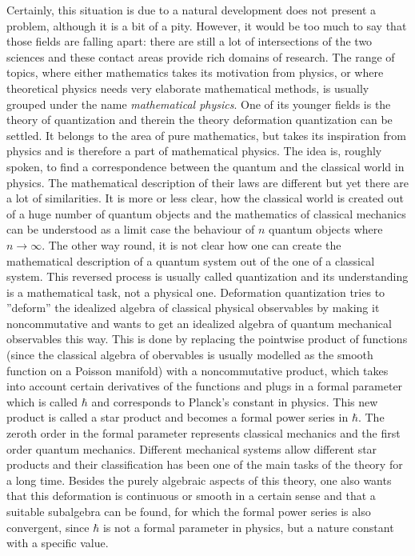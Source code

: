 Certainly, this situation is due to a natural development does not present a 
problem, although it is a bit of a pity. However, it would be too much to say 
that those fields are falling apart: there are still a lot of intersections of 
the two sciences and these contact areas provide rich domains of research. The 
range of topics, where either mathematics takes its motivation from physics, 
or where theoretical physics needs very elaborate mathematical methods, is 
usually grouped under the name \emph{mathematical physics}. One of its younger 
fields is the theory of quantization and therein the theory deformation 
quantization can be settled. It belongs to the area of 
pure mathematics, but takes its inspiration from physics and is therefore a 
part of mathematical physics. The idea is, roughly spoken, to find a 
correspondence between the quantum and the classical world in physics. The 
mathematical description of their laws are different but yet there are a lot of 
similarities. It is more or less clear, how the classical world is created out 
of a huge number of quantum objects and the mathematics of classical mechanics 
can be understood as a limit case the behaviour of $n$ quantum objects where 
$n \longrightarrow \infty$. The other way round, it is not clear how one can 
create the mathematical description of a quantum system out of the one of a 
classical system. This reversed process is usually called quantization and its 
understanding is a mathematical task, not a physical one. Deformation 
quantization tries to ''deform'' the idealized algebra of classical physical 
observables by making it noncommutative and wants to get an idealized algebra 
of quantum mechanical observables this way. This is done by replacing the 
pointwise product of functions (since the classical algebra of obervables is 
usually modelled as the smooth function on a Poisson manifold) with a 
noncommutative product, which takes into account certain derivatives of the 
functions and plugs in a formal parameter which is called $\hbar$ and 
corresponds to Planck's constant in physics. This new product is called 
a star product and becomes a formal power series in $\hbar$. The zeroth order 
in the formal parameter represents classical mechanics and the first order 
quantum mechanics. Different mechanical systems allow different star products 
and their classification has been one of the main tasks of the theory for a 
long time. Besides the purely algebraic aspects of this theory, one also wants 
that this deformation is continuous or smooth in a certain sense and that a 
suitable subalgebra can be found, for which the formal power series is also 
convergent, since $\hbar$ is not a formal parameter in physics, but a nature 
constant with a specific value.



